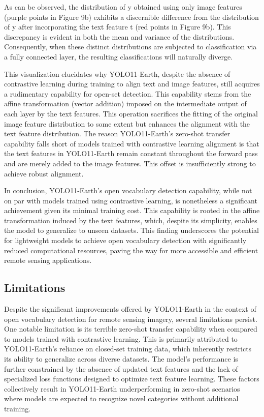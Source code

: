 \documentclass{article}
\begin{document}
As can be observed, the distribution of y obtained using only image features (purple points in Figure 9b) 
exhibits a discernible difference from the distribution of y after incorporating the text feature t (red points 
in Figure 9b). This discrepancy is evident in both the mean and variance of the distributions. Consequently, 
when these distinct distributions are subjected to classification via a fully connected layer, the resulting 
classifications will naturally diverge.

This visualization elucidates why YOLO11-Earth, despite the absence of contrastive learning during training 
to align text and image features, still acquires a rudimentary capability for open-set detection. This capability 
stems from the affine transformation (vector addition) imposed on the intermediate output of each layer by the 
text features. This operation sacrifices the fitting of the original image feature distribution to some extent 
but enhances the alignment with the text feature distribution. The reason YOLO11-Earth's zero-shot transfer 
capability falls short of models trained with contrastive learning alignment is that the text features in 
YOLO11-Earth remain constant throughout the forward pass and are merely added to the image features. This offset 
is insufficiently strong to achieve robust alignment.

In conclusion, YOLO11-Earth's open vocabulary detection capability, while not on par with models trained 
using contrastive learning, is nonetheless a significant achievement given its minimal training cost. This 
capability is rooted in the affine transformation induced by the text features, which, despite its simplicity, 
enables the model to generalize to unseen datasets. This finding underscores the potential for lightweight models 
to achieve open vocabulary detection with significantly reduced computational resources, paving the way for 
more accessible and efficient remote sensing applications.

\subsection{ Limitations}
Despite the significant improvements offered by YOLO11-Earth in the context of open vocabulary detection for 
remote sensing imagery, several limitations persist. One notable limitation is its terrible zero-shot transfer 
capability when compared to models trained with contrastive learning. This is primarily attributed to 
YOLO11-Earth's reliance on closed-set training data, which inherently restricts its ability to generalize 
across diverse datasets. The model's performance is further constrained by the absence of updated text features 
and the lack of specialized loss functions designed to optimize text feature learning. These factors collectively 
result in YOLO11-Earth underperforming in zero-shot scenarios where models are expected to recognize novel 
categories without additional training.
\end{document}
